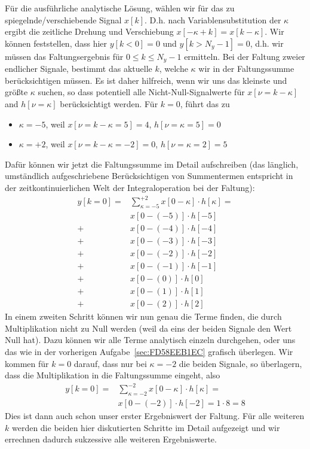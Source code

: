 \clearpage
Für die ausführliche analytische Lösung, wählen wir für das zu spiegelnde/verschiebende
Signal $x[k]$.
D.h. nach Variablensubstitution der $\kappa$ ergibt die zeitliche
Drehung und Verschiebung $x[-\kappa+k]=x[k-\kappa]$.
%
Wir können feststellen, dass hier $y[k<0]=0$ und $y[k>N_y-1]=0$, d.h.
wir müssen das Faltungsergebnis für $0\leq k \leq N_y-1$ ermitteln.
%
Bei der Faltung zweier endlicher Signale, bestimmt das aktuelle $k$, welche $\kappa$
wir in der Faltungssumme berücksichtigen müssen.
Es ist daher hilfreich, wenn wir uns das kleinste und größte $\kappa$ suchen,
so dass potentiell alle Nicht-Null-Signalwerte für $x[\nu=k-\kappa]$ and $h[\nu=\kappa]$
berücksichtigt werden.
Für $k=0$, führt das zu
\begin{itemize}
\item $\kappa=-5$, weil $x[\nu=k-\kappa=5]=4$, $h[\nu=\kappa=5]=0$
\item $\kappa=+2$, weil $x[\nu=k-\kappa=-2]=0$, $h[\nu=\kappa=2]=5$
\end{itemize}
Dafür können wir jetzt die Faltungssumme im Detail aufschreiben
(das länglich, umständlich aufgeschriebene Berücksichtigen von Summentermen
entspricht in der zeitkontinuierlichen Welt der Integraloperation bei der Faltung):
%
\begin{align}
y[k=0] = &\sum\limits_{\kappa = -5}^{+2} x[0 -\kappa] \cdot h[\kappa] =\\
&x[0 -(-5)] \cdot h[-5]\nonumber\\
+&x[0 -(-4)] \cdot h[-4]\nonumber\\
+&x[0 -(-3)] \cdot h[-3]\nonumber\\
+&x[0 -(-2)] \cdot h[-2]\nonumber\\
+&x[0 -(-1)] \cdot h[-1]\nonumber\\
+&x[0 -(0)] \cdot h[0]\nonumber\\
+&x[0 -(1)] \cdot h[1]\nonumber\\
+&x[0 -(2)] \cdot h[2]
\end{align}
In einem zweiten Schritt können wir nun genau die Terme finden, die durch
Multiplikation nicht zu Null werden (weil da eins der beiden Signale den Wert
Null hat).
Dazu können wir alle Terme analytisch einzeln durchgehen, oder uns das wie
in der vorherigen Aufgabe~\ref{sec:FD58EEB1EC} grafisch überlegen.
Wir kommen für $k=0$ darauf, dass nur bei $\kappa=-2$ die beiden Signale, so
überlagern, dass die Multiplikation in die Faltungssumme eingeht, also
\begin{align}
y[k=0] = & \sum\limits_{\kappa = -2}^{-2} x[0 -\kappa] \cdot h[\kappa] =\\
&x[0 -(-2)] \cdot h[-2] = 1 \cdot 8 = 8\nonumber
\end{align}
Dies ist dann auch schon unser erster Ergebniswert der Faltung. Für alle weiteren
$k$ werden die beiden hier diskutierten Schritte im Detail aufgezeigt und
wir errechnen dadurch sukzessive alle weiteren Ergebniswerte.

